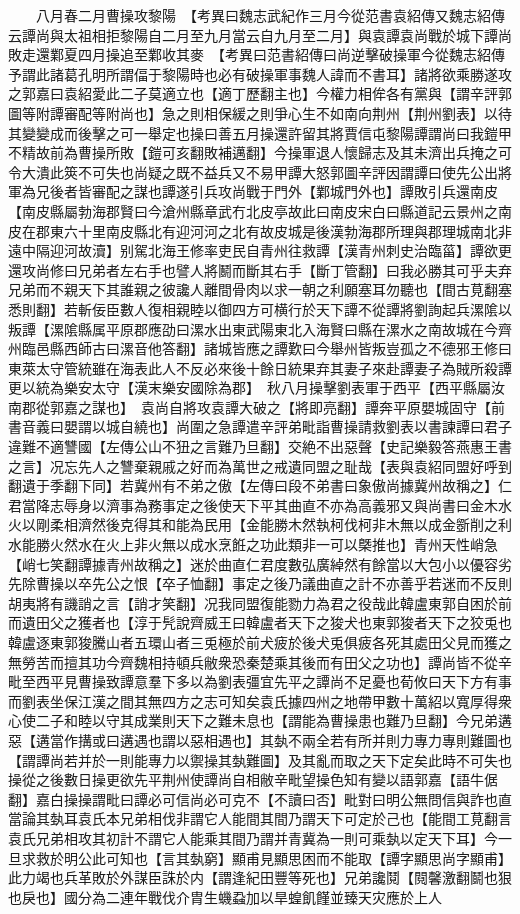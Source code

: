 　　八月春二月曹操攻黎陽　【考異曰魏志武紀作三月今從范書袁紹傳又魏志紹傳云譚尚與太祖相拒黎陽自二月至九月當云自九月至二月】與袁譚袁尚戰於城下譚尚敗走還鄴夏四月操追至鄴收其麥　【考異曰范書紹傳曰尚逆擊破操軍今從魏志紹傳　予謂此諸葛孔明所謂偪于黎陽時也必有破操軍事魏人諱而不書耳】諸將欲乘勝遂攻之郭嘉曰袁紹愛此二子莫適立也【適丁歷翻主也】今權力相侔各有黨與【謂辛評郭圖等附譚審配等附尚也】急之則相保緩之則爭心生不如南向荆州【荆州劉表】以待其變變成而後擊之可一舉定也操曰善五月操還許留其將賈信屯黎陽譚謂尚曰我鎧甲不精故前為曹操所敗【鎧可亥翻敗補邁翻】今操軍退人懷歸志及其未濟出兵掩之可令大潰此筴不可失也尚疑之既不益兵又不易甲譚大怒郭圖辛評因謂譚曰使先公出將軍為兄後者皆審配之謀也譚遂引兵攻尚戰于門外【鄴城門外也】譚敗引兵還南皮【南皮縣屬勃海郡賢曰今滄州縣章武冇北皮亭故此曰南皮宋白曰縣道記云景州之南皮在郡東六十里南皮縣北有迎河河之北有故皮城是後漢勃海郡所理與郡理城南北非遠中隔迎河故瀆】别駕北海王修率吏民自青州往救譚【漢青州刺史治臨菑】譚欲更還攻尚修曰兄弟者左右手也譬人將鬭而斷其右手【斷丁管翻】曰我必勝其可乎夫弃兄弟而不親天下其誰親之彼讒人離間骨肉以求一朝之利願塞耳勿聽也【間古莧翻塞悉則翻】若斬佞臣數人復相親睦以御四方可横行於天下譚不從譚將劉詢起兵漯隂以叛譚【漯隂縣属平原郡應劭曰漯水出東武陽東北入海賢曰縣在漯水之南故城在今齊州臨邑縣西師古曰漯音他答翻】諸城皆應之譚歎曰今舉州皆叛豈孤之不德邪王修曰東萊太守管統雖在海表此人不反必來後十餘日統果弃其妻子來赴譚妻子為賊所殺譚更以統為樂安太守【漢末樂安國除為郡】　秋八月操擊劉表軍于西平【西平縣屬汝南郡從郭嘉之謀也】　袁尚自將攻袁譚大破之【將即亮翻】譚奔平原嬰城固守【前書音義曰嬰謂以城自繞也】尚圍之急譚遣辛評弟毗詣曹操請救劉表以書諫譚曰君子違難不適讐國【左傳公山不狃之言難乃旦翻】交絶不出惡聲【史記樂毅答燕惠王書之言】况忘先人之讐棄親戚之好而為萬世之戒遺同盟之耻哉【表與袁紹同盟好呼到翻遺于季翻下同】若冀州有不弟之傲【左傳曰段不弟書曰象傲尚據冀州故稱之】仁君當降志辱身以濟事為務事定之後使天下平其曲直不亦為高義邪又與尚書曰金木水火以剛柔相濟然後克得其和能為民用【金能勝木然執柯伐柯非木無以成金斵削之利水能勝火然水在火上非火無以成水烹餁之功此類非一可以槩推也】青州天性峭急【峭七笑翻譚據青州故稱之】迷於曲直仁君度數弘廣綽然有餘當以大包小以優容劣先除曹操以卒先公之恨【卒子恤翻】事定之後乃議曲直之計不亦善乎若迷而不反則胡夷將有譏誚之言【誚才笑翻】况我同盟復能勠力為君之役哉此韓盧東郭自困於前而遺田父之獲者也【淳于髠說齊威王曰韓盧者天下之狻犬也東郭狻者天下之狡兎也韓盧逐東郭狻騰山者五環山者三兎極於前犬疲於後犬兎俱疲各死其處田父見而獲之無勞苦而擅其功今齊魏相持頓兵敝衆恐秦楚乘其後而有田父之功也】譚尚皆不從辛毗至西平見曹操致譚意羣下多以為劉表彊宜先平之譚尚不足憂也荀攸曰天下方有事而劉表坐保江漢之間其無四方之志可知矣袁氏據四州之地帶甲數十萬紹以寬厚得衆心使二子和睦以守其成業則天下之難未息也【謂能為曹操患也難乃旦翻】今兄弟遘惡【遘當作搆或曰遘遇也謂以惡相遇也】其埶不兩全若有所并則力專力專則難圖也【謂譚尚若并於一則能專力以禦操其埶難圖】及其亂而取之天下定矣此時不可失也操從之後數日操更欲先平荆州使譚尚自相敝辛毗望操色知有變以語郭嘉【語牛倨翻】嘉白操操謂毗曰譚必可信尚必可克不【不讀曰否】毗對曰明公無問信與詐也直當論其埶耳袁氏本兄弟相伐非謂它人能間其間乃謂天下可定於己也【能間工莧翻言袁氏兄弟相攻其初計不謂它人能乘其間乃謂并青冀為一則可乘埶以定天下耳】今一旦求救於明公此可知也【言其埶窮】顯甫見顯思困而不能取【譚字顯思尚字顯甫】此力竭也兵革敗於外謀臣誅於内【謂逢紀田豐等死也】兄弟讒鬩【䦧馨激翻鬬也狠也戾也】國分為二連年戰伐介胄生蟣蝨加以旱蝗飢饉並臻天灾應於上人